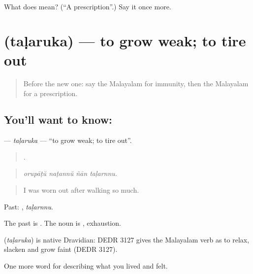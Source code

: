 \begin{tcolorbox}[breakable,colback=teal!4,colframe=teal!35!black,title={Before you move on}]
What does  mean? (\textquotedblleft{}A prescription\textquotedblright{}.) Say it once more.
\end{tcolorbox}
\section[\texorpdfstring{\ml{തളരുക} (taḷaruka)}{തളരുക (taḷaruka)}]{ (taḷaruka) — to grow weak; to tire out}

\label{lesson:ML-C533-talaruka}



\begin{quote}
Before the new one: say the Malayalam for immunity, then the Malayalam for a prescription.
\end{quote}

\subsection*{You'll want to know: }
\textbf{} — \emph{taḷaruka} — \textquotedblleft{}to grow weak; to tire out\textquotedblright{}.

\begin{quote}
   .
\end{quote}

\begin{quote}
\emph{orupāṭŭ naṭannŭ ñān taḷarnnu.}
\end{quote}

\begin{quote}
I was worn out after walking so much.
\end{quote}

Past: , \emph{taḷarnnu}.

The past is . The noun is , exhaustion.

\begin{cousinweb}
\textbf{} (\emph{taḷaruka}) is native Dravidian: DEDR 3127 gives the Malayalam verb as to relax, slacken and grow faint (DEDR 3127).
\end{cousinweb}

\begin{grammarlens}[title={What you've built}]
One more word for describing what you lived and felt.
\end{grammarlens}

